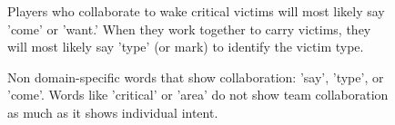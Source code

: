     
\begin{figure}[h!]
    \centering
    \caption{Players who collaborate to wake critical victims will most likely say 'come' or 'want.' When they work together to carry victims, they will most likely say 'type' (or mark) to identify the victim type.}
    \end{figure}

\begin{figure}[h!]
    \centering
    \caption{Non domain-specific words that show collaboration: 'say', 'type',
        or 'come'. Words like 'critical' or 'area' do not show team collaboration as much as it shows individual intent. 
         }
\end{figure}
